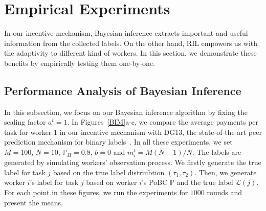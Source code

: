 \section{Empirical Experiments} 
In our incentive mechanism, Bayesian inference extracts important and useful information from the collected labels. On the other hand, RIL empowers us with the adaptivity to different kind of workers. In this section, we demonstrate these benefits by empirically testing them one-by-one.


\subsection{Performance Analysis of Bayesian Inference}
In this subsection, we focus on our Bayesian inference algorithm by fixing the scaling factor $a^t=1$.
In Figures~\ref{BIM}a-c, we compare the average payments per task for worker $1$ in our incentive mechanism with DG13, the state-of-the-art peer prediction mechanism for binary labels~\cite{dasgupta2013crowdsourced}.
In all these experiments, we set $M=100$, $N=10$, $\mathbb{P}_H=0.8$, $b=0$ and $m_i^t=M(N-1)/N$.
The labels are generated by simulating workers' observation process.
We firstly generate the true label for task $j$ based on the true label distriubtion $(\tau_1, \tau_2)$.
Then, we generate worker $i$'s label for task $j$ based on worker $i$'s PoBC $\mathbb{P}$ and the true label $\mathcal{L}(j)$.
For each point in these figures, we run the experiments for $1000$ rounds and present the means.

